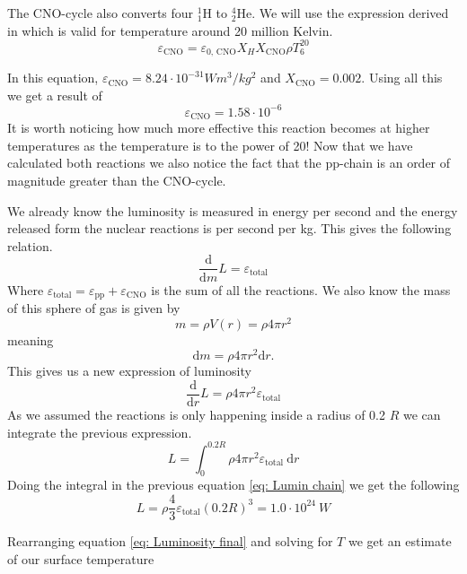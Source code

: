 \documentclass[reprint,english,notitlepage]{revtex4-2}
\begin{document}
The CNO-cycle also converts four $ _{1}^{1}\text{H} $ to $ _{2}^{4}\text{He} $.
We will use the expression derived in%
which is valid for temperature around 20 million Kelvin.
\begin{equation}\label{eq: CNO-cycle}
  ε_{\text{CNO}} = ε_{\text{0, CNO}}X_{H}X_{\text{CNO}}ρT^{20}_{6}
\end{equation}\newline

In this equation, $ ε_{\text{CNO}} = 8.24 ⋅ 10^{-31}Wm^{3} / kg^{2} $ and $ X_{\text{CNO}} = 0.002 $. Using all this we get a result of 
\begin{equation}\label{eq: E_CNO}
  ε_{\text{CNO}} = 1.58 ⋅ 10^{-6}
\end{equation}
It is worth noticing how much more effective this reaction becomes at higher temperatures as the temperature is to the power of 20! Now that we have calculated both reactions we also notice the fact that the pp-chain is an order of magnitude greater than the CNO-cycle. 

We already know the luminosity is measured in energy per second and the energy released form the nuclear reactions is per second per kg. This gives the following relation. 
\begin{equation}\label{}
  \frac{\mathrm{d}}{\mathrm{d}m} L= ε_{\text{total}}
\end{equation}
Where $ ε_{\text{total}} = ε_{\text{pp}} + ε_{\text{CNO}} $ is the sum of all the reactions. We also know the mass of this sphere of gas is given by 
\[
m = ρV(r) = ρ 4 π r^{2}
\]
meaning 
\[
\mathrm{d}m = ρ 4 π r^{2}\mathrm{d}r. 
\]
This gives us a new expression of luminosity
\begin{equation}\label{}
  \frac{\mathrm{d}}{\mathrm{d}r} L = ρ4 π r^{2} ε_{\text{total}}
\end{equation}
As we assumed the reactions is only happening inside a radius of 0.2 $ R $ we can integrate the previous expression. 
\begin{equation}\label{eq: Lumin chain}
  L = \int_{0}^{0.2R } ρ4 π r^{2} ε_{\text{total}}\ \mathrm{d}r 
\end{equation}
Doing the integral in the previous equation \ref{eq: Lumin chain} we get the following
\begin{equation}\label{eq: Lumin chain final }
  L = ρ \frac{4}{3} ε_{\text{total}} (0.2R)^{3} = 1.0 ⋅ 10^{24} \ W
\end{equation}

Rearranging equation \ref{eq: Luminosity final} and solving for $ T $ we get an estimate of our surface temperature
\end{document}
